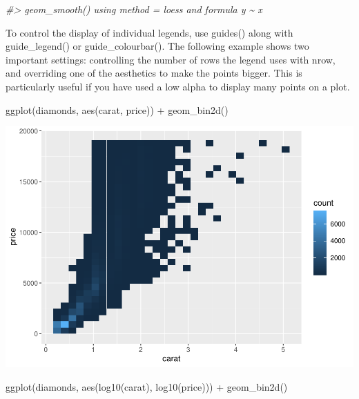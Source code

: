 \documentclass[
]{article}
\newenvironment{Shaded}{\begin{snugshade}}{\end{snugshade}}
\newcommand{\CommentTok}[1]{\textcolor[rgb]{0.56,0.35,0.01}{\textit{#1}}}
\newcommand{\FunctionTok}[1]{\textcolor[rgb]{0.00,0.00,0.00}{#1}}
\newcommand{\NormalTok}[1]{#1}
\newcommand{\SpecialCharTok}[1]{\textcolor[rgb]{0.00,0.00,0.00}{#1}}
\begin{document}
\begin{Shaded}
\begin{Highlighting}[]
\CommentTok{\#\textgreater{} \textasciigrave{}geom\_smooth()\textasciigrave{} using method = \textquotesingle{}loess\textquotesingle{} and formula \textquotesingle{}y \textasciitilde{} x\textquotesingle{}}
\end{Highlighting}
\end{Shaded}

To control the display of individual legends, use guides() along with
guide\_legend() or guide\_colourbar(). The following example shows two
important settings: controlling the number of rows the legend uses with
nrow, and overriding one of the aesthetics to make the points bigger.
This is particularly useful if you have used a low alpha to display many
points on a plot.

\begin{Shaded}
\begin{Highlighting}[]
\FunctionTok{ggplot}\NormalTok{(diamonds, }\FunctionTok{aes}\NormalTok{(carat, price)) }\SpecialCharTok{+}
  \FunctionTok{geom\_bin2d}\NormalTok{()}
\end{Highlighting}
\end{Shaded}

\includegraphics{Journal_files/figure-latex/unnamed-chunk-64-1.pdf}

\begin{Shaded}
\begin{Highlighting}[]
\FunctionTok{ggplot}\NormalTok{(diamonds, }\FunctionTok{aes}\NormalTok{(}\FunctionTok{log10}\NormalTok{(carat), }\FunctionTok{log10}\NormalTok{(price))) }\SpecialCharTok{+}
  \FunctionTok{geom\_bin2d}\NormalTok{()}
\end{Highlighting}
\end{Shaded}
\end{document}
